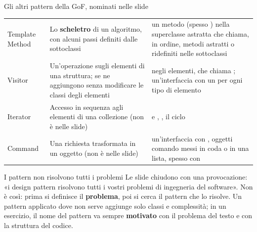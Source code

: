 \begin{guida}{{\badge[pcolore]{\thevoce}\enspace Gli altri pattern della GoF, nominati nelle slide}}
\begin{tabular}{@{}>{\bfseries\raggedright\arraybackslash}p{2.6cm} P{6.6cm} P{8.3cm}@{}}
  Template Method & Lo \textbf{scheletro} di un algoritmo, con alcuni passi definiti dalle sottoclassi & un metodo
    (spesso ) nella superclasse astratta che chiama, in ordine, metodi astratti o 
    ridefiniti nelle sottoclassi \\
  Visitor & Un'operazione sugli elementi di una struttura; se ne aggiungono senza modificare le classi degli
    elementi &  negli elementi, che chiama ; un'interfaccia 
    con un  per ogni tipo di elemento \\
  Iterator & Accesso in sequenza agli elementi di una collezione (non è nelle slide) &  e
    , , il ciclo  \\
  Command & Una richiesta trasformata in un oggetto (non è nelle slide) & un'interfaccia con , oggetti
    comando messi in coda o in una lista, spesso con  \\
\end{tabular}
\end{guida}

\begin{attenzione}{I pattern non risolvono tutti i problemi}
Le slide chiudono con una provocazione: «i design pattern risolvono tutti i vostri problemi di ingegneria del
software». Non è così: prima si definisce il \textbf{problema}, poi si cerca il pattern che lo risolve. Un pattern
applicato dove non serve aggiunge solo classi e complessità; in un esercizio, il nome del pattern va sempre
\textbf{motivato} con il problema del testo e con la struttura del codice.
\end{attenzione}
